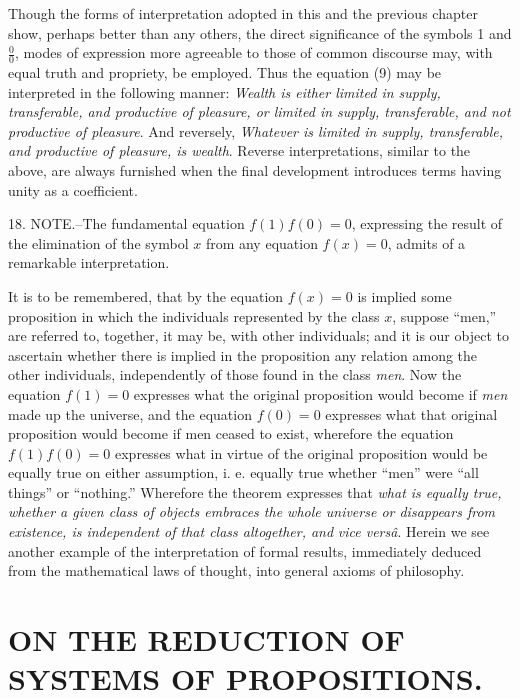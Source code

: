 \documentclass[oneside]{book}
\begin{document}
Though the forms of interpretation adopted in this and the
previous chapter show, perhaps better than any others, the direct
significance of the symbols 1 and $\frac{0}{0}$, modes of expression
more agreeable to those of common discourse may, with equal
truth and propriety, be employed. Thus the equation (9) may
be interpreted in the following manner: \textit{Wealth is either limited
in supply, transferable, and productive of pleasure, or limited in supply,
transferable, and not productive of pleasure}. And reversely,
\textit{Whatever is limited in supply, transferable, and productive of pleasure,
is wealth}. Reverse interpretations, similar to the above, are
always furnished when the final development introduces terms
having unity as a coefficient.

18. NOTE.--The fundamental equation $f(1)f(0) = 0$, expressing
the result of the elimination of the symbol $x$ from any
equation $f(x) = 0$, admits of a remarkable interpretation.

It is to be remembered, that by the equation $f(x) = 0$ is implied
some proposition in which the individuals represented by
the class $x$, suppose ``men,'' are referred to, together, it may be,
with other individuals; and it is our object to ascertain whether
there is implied in the proposition any relation among the other
individuals, independently of those found in the class \textit{men}. Now
the equation $f(1) = 0$ expresses what the original proposition
would become if \textit{men} made up the universe, and the equation
$f(0) = 0$ expresses what that original proposition would become
if men ceased to exist, wherefore the equation $f(1)f(0) = 0$ expresses
what in virtue of the original proposition would be
equally true on either assumption, i. e. equally true whether
``men'' were ``all things'' or ``nothing.'' Wherefore the theorem
expresses that \textit{what is equally true, whether a given class of
objects embraces the whole universe or disappears from existence,
is independent of that class altogether, and} \textit{vice vers\^{a}}. Herein
we see another example of the interpretation of formal results,
immediately deduced from the mathematical laws of thought, into
general axioms of philosophy.



\chapter[OF REDUCTION]
{\large ON THE REDUCTION OF SYSTEMS OF PROPOSITIONS.}
\end{document}
